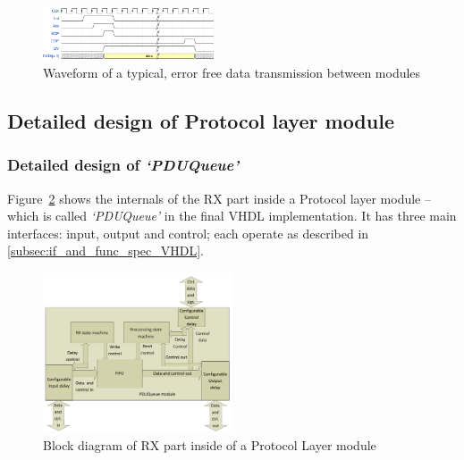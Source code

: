 \documentclass[conference]{IEEEtran}
\begin{document}
\begin{figure}[!htb]
    \centering
    \includegraphics[width=0.45\textwidth]{figures_raw/data_signals.png}
    \caption{Waveform of a typical, error free data transmission between modules}
    \label{fig:data_signals}
\end{figure}

\subsection{Detailed design of Protocol layer module}

\subsubsection{Detailed design of \emph{`PDUQueue'}}\label{subsubsec:PDUQueue_details}

Figure~\ref{fig:proto_layer_rx_sch} shows the internals of the RX part inside a Protocol layer module -- which is
called \emph{`PDUQueue'} in the final VHDL implementation. It has three main interfaces: input, output and control;
each operate as described in \ref{subsec:if_and_func_spec_VHDL}.

\begin{figure}[!htb]
    \centering
    \includegraphics[width=0.5\textwidth]{figures_raw/pdu_queue_imp.pdf}
    \caption{Block diagram of RX part inside of a Protocol Layer module}
    \label{fig:proto_layer_rx_sch}
\end{figure}
\end{document}

